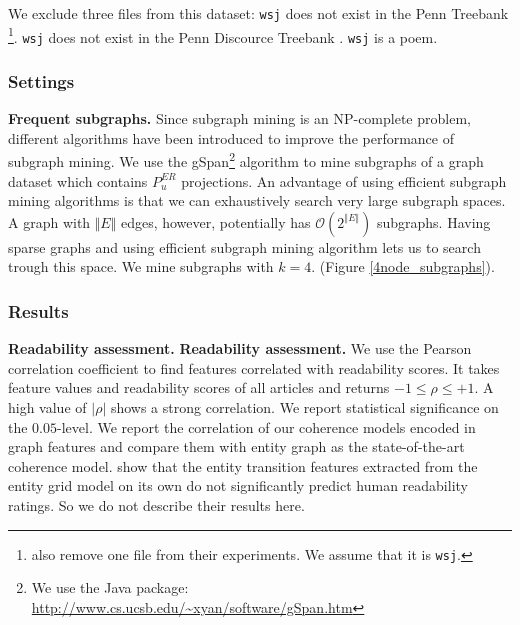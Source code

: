             We exclude three files from this dataset: \texttt{wsj} does not exist in the Penn Treebank \cite{marcus94}\footnote{ also remove one file from their experiments. 
            We assume that it is  \texttt{wsj}.}. \texttt{wsj} does not exist in the Penn Discource Treebank \cite{prasad08a}. \texttt{wsj} is a poem.





\subsubsection{Settings}
%



\textbf{Frequent subgraphs.} Since subgraph mining is an NP-complete problem, different algorithms have been introduced to
improve the performance of subgraph mining. 
We use the gSpan\footnote{We use the Java package: \url{http://www.cs.ucsb.edu/~xyan/software/gSpan.htm}} algorithm \cite{yanxifeng02} to mine subgraphs of a graph dataset which contains $P_u^{ER}$ projections. 
An advantage of using efficient subgraph mining algorithms is that we can exhaustively search very large subgraph spaces. 
A graph with $\Vert E \Vert$ edges, however, potentially has $\mathcal{O}(2^{\Vert E \Vert})$ subgraphs. 
Having sparse graphs and using efficient subgraph mining algorithm lets us to search trough this space. 
We mine subgraphs with $k=4$. (Figure \ref{4node_subgraphs}).




%


%



\subsubsection{Results}\label{subsec:results}
%
\textbf{Readability assessment.}  
\noindent
\textbf{Readability assessment.} We use the Pearson correlation coefficient to find features correlated with readability scores. 
It takes feature values and readability scores of all articles and returns $-1\leq\rho\leq+1$. 
A high value of $|\rho|$ shows a strong correlation. 
We report statistical significance on the $0.05$-level. 
We report the correlation of our coherence models encoded in graph features and compare them with  entity graph as the state-of-the-art coherence model. 
 show that the entity transition features extracted from the entity grid model \cite{barzilay08} on its own do not significantly predict human
readability ratings. 
So we do not describe their results here.

